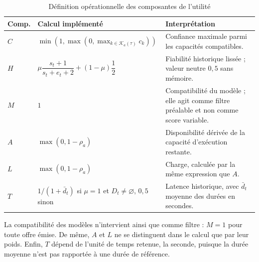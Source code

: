 \begin{table}[H]
\centering
\caption{Définition opérationnelle des composantes de l'utilité}
\label{tab:spec-utilite}
\small
\begin{tabularx}{\textwidth}{p{} p{} X}
\toprule
\textbf{Comp.} & \textbf{Calcul implémenté} & \textbf{Interprétation} \\
\midrule
$C$ & $\min\!\left(1,\max\!\left(0,\max_{k\in\mathcal{K}_a(\tau)}c_k\right)\right)$
& Confiance maximale parmi les capacités compatibles. \\
$H$ & $\mu\dfrac{s_t+1}{s_t+e_t+2}+(1-\mu)\dfrac{1}{2}$
& Fiabilité historique lissée ; valeur neutre $0{,}5$ sans mémoire. \\
$M$ & $1$
& Compatibilité du modèle ; elle agit comme filtre préalable et non comme score variable. \\
$A$ & $\max(0,1-\rho_a)$
& Disponibilité dérivée de la capacité d'exécution restante. \\
$L$ & $\max(0,1-\rho_a)$
& Charge, calculée par la même expression que $A$. \\
$T$ & $1/(1+\bar d_t)$ si $\mu=1$ et $D_t\neq\varnothing$, $0{,}5$ sinon
& Latence historique, avec $\bar d_t$ moyenne des durées en secondes. \\
\bottomrule
\end{tabularx}
\end{table}

La compatibilité des modèles n'intervient ainsi que comme filtre : $M=1$ pour toute offre
émise. De même, $A$ et $L$ ne se distinguent dans le calcul que par leur poids. Enfin,
$T$ dépend de l'unité de temps retenue, la seconde, puisque la durée moyenne n'est pas
rapportée à une durée de référence.

